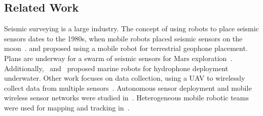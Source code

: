 \subsection{Related Work}

Seismic surveying is a large industry.
The concept of using robots to place seismic sensors dates to the 1980s, when mobile robots placed seismic sensors on the moon~\cite{LSisMSE81}.
\cite{DSSMaA14} and \cite{coste2013seismic} proposed using a mobile robot for terrestrial geophone placement.
Plans are underway for a swarm of seismic sensors for Mars exploration~\cite{MAPL2006}.
Additionally,~\cite{muyzert2015marine} and~\cite{postel2014drone} proposed marine robots for hydrophone deployment underwater. 
Other work  focuses on data collection, using a UAV to wirelessly collect data from multiple sensors~\cite{wilcox2013seismic}.
Autonomous sensor deployment and mobile wireless sensor networks were studied in~\cite{howard2002mobile,corke2004autonomous,tuna2014autonomous}.
Heterogeneous mobile robotic teams were used for mapping and tracking in~\cite{howard2006experiments}.
